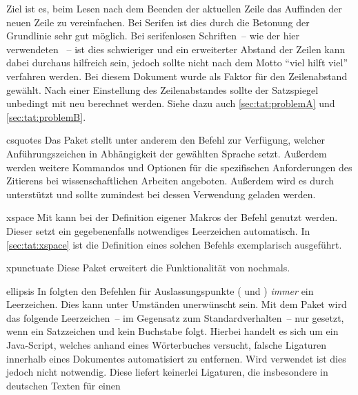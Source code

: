 \documentclass[%
  english,ngerman,%
  headings=optiontoheadandtoc,captions=tableheading,numbers=noenddot,%
  chapterpage,cdfoot,%
]{tudscrman}
\begin{document}
\begin{packages}
  Ziel ist es, beim Lesen nach dem Beenden der aktuellen Zeile das Auffinden der 
  neuen Zeile zu vereinfachen. Bei Serifen ist dies durch die Betonung der 
  Grundlinie sehr gut möglich. Bei serifenlosen Schriften~-- wie der hier 
  verwendeten \Univers~-- ist dies schwieriger und ein erweiterter Abstand der 
  Zeilen kann dabei durchaus hilfreich sein, jedoch sollte nicht nach dem Motto 
  \enquote{viel hilft viel} verfahren werden. Bei diesem Dokument wurde als 
  Faktor für den Zeilenabstand  gewählt. Nach 
  einer Einstellung des Zeilenabstandes sollte der Satzspiegel unbedingt mit 
   neu berechnet werden. Siehe dazu auch 
  \autoref{sec:tat:problemA} und \ref{sec:tat:problemB}.
\item[csquotes]
  Das Paket stellt unter anderem den Befehl  
  zur Verfügung, welcher Anführungszeichen in Abhängigkeit der gewählten   
  Sprache setzt. Außerdem werden weitere Kommandos und Optionen für die   
  spezifischen Anforderungen des Zitierens bei wissenschaftlichen Arbeiten   
  angeboten. Außerdem wird es durch  unterstützt und sollte 
  zumindest bei dessen Verwendung geladen werden.
\item[xspace]
  Mit  kann bei der Definition eigener Makros der Befehl 
   genutzt werden. Dieser setzt ein gegebenenfalls notwendiges 
  Leerzeichen automatisch. In \autoref{sec:tat:xspace} ist die Definition eines 
  solchen Befehls exemplarisch ausgeführt.
\item[xpunctuate]
  Diese Paket erweitert die Funktionalität von  nochmals.
\item[ellipsis]
  In  folgten den Befehlen für Auslassungspunkte ( 
  und ) \emph{immer} ein Leerzeichen. Dies kann unter 
  Umständen unerwünscht sein. Mit dem Paket  wird das 
  folgende Leerzeichen~-- im Gegensatz zum Standardverhalten~-- nur gesetzt, 
  wenn ein Satzzeichen und kein Buchstabe folgt.
\makeatletter{}\makeatother
  Hierbei handelt es sich um ein Java-Script, welches anhand eines Wörterbuches 
  versucht, falsche Ligaturen innerhalb eines Dokumentes automatisiert zu 
  entfernen. Wird \Univers verwendet ist dies jedoch nicht notwendig. Diese 
  liefert keinerlei Ligaturen, die insbesondere in deutschen Texten für einen 

\end{packages}
\end{document}
